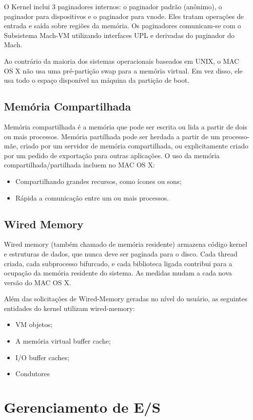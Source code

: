 \documentclass[12pt]{article}
\begin{document}
O Kernel inclui 3 paginadores internos: o paginador padrão (anônimo), o paginador para dispositivos e o paginador para vnode. Eles tratam operações de entrada e saída sobre regiões da memória. Os paginadores comunicam-se com o Subsistema Mach-VM utilizando interfaces UPL e derivadas do paginador do Mach.

Ao contrário da maioria dos sistemas operacionais baseados em UNIX, o MAC OS X não usa uma pré-partição swap para a memória virtual. Em vez disso, ele usa todo o espaço disponível na máquina da partição de
boot.
\subsection{Memória Compartilhada}
Memória compartilhada é a memória que pode ser escrita ou lida a partir de dois ou mais processos. Memória partilhada pode ser herdada a partir de um processo-mãe, criado por um servidor de memória compartilhada, ou explicitamente criado por um pedido de exportação para outras aplicações. O uso da memória compartilhada/partilhada incluem no MAC OS X:

\begin{itemize}
    \item Compartilhando grandes recursos, como ícones ou sons;
    \item Rápida a comunicação entre um ou mais processos.
\end{itemize}
\subsection{Wired Memory}
Wired memory (também chamado de memória residente) armazena código kernel e estruturas de dados, que nunca deve ser paginada para o disco.
Cada thread criada, cada subprocesso bifurcado, e cada biblioteca ligada
contribui para a ocupação da memória residente do sistema.
As medidas mudam a cada nova versão do MAC OS X.

Além das solicitações de Wired-Memory geradas no nível do usuário, as seguintes entidades do kernel utilizam wired-memory:
\begin{itemize}
    \item VM objetos;
    \item A memória virtual buffer cache;
    \item I/O buffer caches;
    \item Condutores
\end{itemize}
\section{Gerenciamento de E/S}
\end{document}
